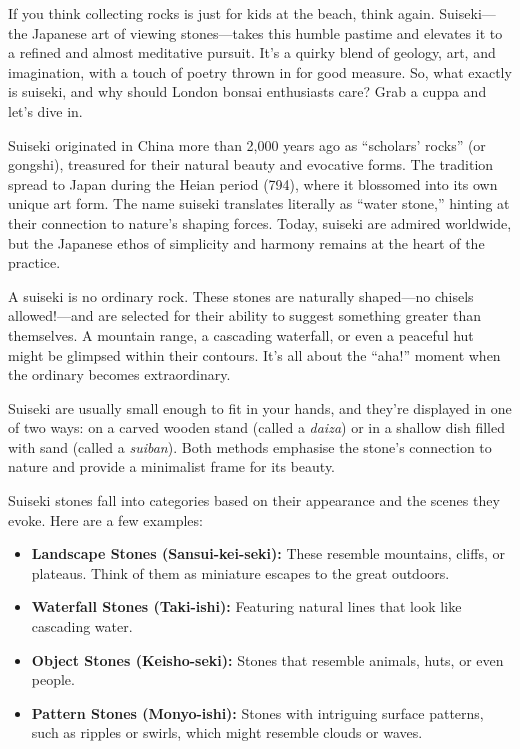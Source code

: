 \label{2024-12-suiseki}

\noindent
If you think collecting rocks is just for kids at the beach, think again.
Suiseki---the Japanese art of viewing stones---takes this humble pastime and elevates it to a refined and almost meditative pursuit.
It's a quirky blend of geology, art, and imagination, with a touch of poetry thrown in for good measure.
So, what exactly is suiseki, and why should London bonsai enthusiasts care?
Grab a cuppa and let's dive in.

Suiseki originated in China more than 2,000 years ago as ``scholars' rocks'' (or gongshi), treasured for their natural beauty and evocative forms.
The tradition spread to Japan during the Heian period (794), where it blossomed into its own unique art form.
The name suiseki translates literally as ``water stone,'' hinting at their connection to nature's shaping forces.
Today, suiseki are admired worldwide, but the Japanese ethos of simplicity and harmony remains at the heart of the practice.

A suiseki is no ordinary rock.
These stones are naturally shaped---no chisels allowed!---and are selected for their ability to suggest something greater than themselves.
A mountain range, a cascading waterfall, or even a peaceful hut might be glimpsed within their contours.
It's all about the ``aha!'' moment when the ordinary becomes extraordinary.

Suiseki are usually small enough to fit in your hands, and they're displayed in one of two ways: on a carved wooden stand (called a \textit{daiza}) or in a shallow dish filled with sand (called a \textit{suiban}).
Both methods emphasise the stone's connection to nature and provide a minimalist frame for its beauty.

\noindent
Suiseki stones fall into categories based on their appearance and the scenes they evoke.
Here are a few examples:

\begin{itemize}
    \item \textbf{Landscape Stones (Sansui\--kei\--seki):} These resemble mountains, cliffs, or plateaus. Think of them as miniature escapes to the great outdoors.
    \item \textbf{Waterfall Stones (Taki\--ishi):} Featuring natural lines that look like cascading water.
    \item \textbf{Object Stones (Keisho\--seki):} Stones that resemble animals, huts, or even people.
    \item \textbf{Pattern Stones (Monyo\--ishi):} Stones with intriguing surface patterns, such as ripples or swirls, which might resemble clouds or waves.
\end{itemize}

